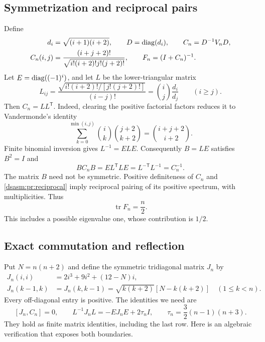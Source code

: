 \documentclass[11pt,letterpaper]{article}
\theoremstyle{remark}\newtheorem{remark}[theorem]{Remark}
\DeclareMathOperator{\tr}{tr}\DeclareMathOperator{\Ran}{Ran}
\begin{document}
\subsection{Symmetrization and reciprocal pairs}
Define
\begin{equation}\label{dsasm:pr:Cdef}
\begin{split}
 d_i&=\sqrt{(i+1)(i+2)},\qquad D=\operatorname{diag}(d_i),\qquad
 C_n=D^{-1}V_nD,\\
 C_n(i,j)&=\frac{(i+j+2)!}{\sqrt{i!(i+2)!j!(j+2)!}},
 \qquad F_n=(I+C_n)^{-1}.
\end{split}
\end{equation}
Let $E=\operatorname{diag}((-1)^i)$, and let $L$ be the lower-triangular matrix
\begin{equation}\label{dsasm:pr:Lfactor}
 L_{ij}=\frac{\sqrt{i!(i+2)!/[j!(j+2)!]}}{(i-j)!}
       =\binom ij\frac{d_i}{d_j}\qquad(i\ge j).
\end{equation}
Then $C_n=LL^{\mathsf T}$. Indeed, clearing the positive factorial factors reduces it to
Vandermonde's identity
\[
 \sum_{k=0}^{\min(i,j)}\binom{i}{k}\binom{j+2}{k+2}
 =\binom{i+j+2}{i+2}.
\]
Finite binomial inversion gives $L^{-1}=ELE$. Consequently
$B=LE$ satisfies $B^2=I$ and
\begin{equation}\label{dsasm:pr:reciprocal}
 B C_n B=E L^{\mathsf T}L E=L^{-\mathsf T}L^{-1}=C_n^{-1}.
\end{equation}
The matrix $B$ need not be symmetric. Positive definiteness of $C_n$
and \eqref{dsasm:pr:reciprocal} imply reciprocal pairing of its positive
spectrum, with multiplicities. Thus
\begin{equation}\label{dsasm:pr:halftrace} \tr F_n=\frac n2.\end{equation}
This includes a possible eigenvalue one, whose contribution is $1/2$.

\subsection{Exact commutation and reflection}
Put $N=n(n+2)$ and define the symmetric tridiagonal matrix $J_n$ by
\begin{equation}\label{dsasm:pr:Jdef}
\begin{split}
 J_n(i,i)&=2i^3+9i^2+(12-N)i,\\
 J_n(k-1,k)&=J_n(k,k-1)=\sqrt{k(k+2)}[N-k(k+2)]
 \quad(1\le k<n).
\end{split}
\end{equation}
Every off-diagonal entry is positive. The identities we need are
\begin{equation}\label{dsasm:pr:Jidentities}
 [J_n,C_n]=0,\qquad
 L^{-1}J_nL=-EJ_nE+2\tau_nI,
 \qquad \tau_n=\frac32(n-1)(n+3).
\end{equation}
They hold as finite matrix identities, including the last row.
Here is an algebraic verification that exposes both boundaries.
\end{document}
